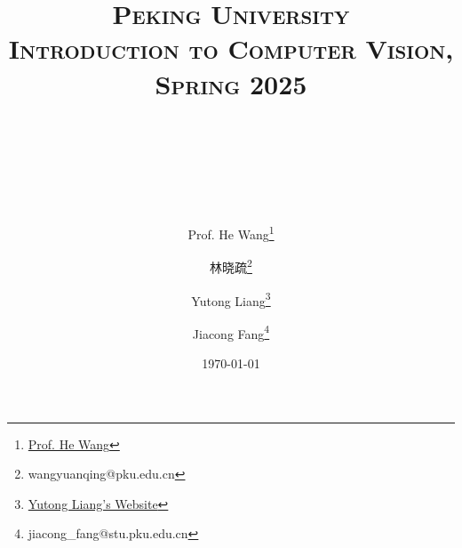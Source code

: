 

\title{
{\normalfont\normalsize\textsc{
Peking University\\
Introduction to Computer Vision, Spring 2025 \\[25pt]}}
\horrule{0.5pt}\\
\\
\horrule{1.8pt}\\[20pt]
}

\author[1]{Prof. He Wang\thanks{\href{https://hughw19.github.io/}{Prof. He Wang}}}
\author[2]{林晓疏\thanks{wangyuanqing@pku.edu.cn}}
\author[2]{Yutong Liang\thanks{\href{https://lyt0112.com/}{Yutong Liang's Website}}}
\author[2]{Jiacong Fang\thanks{jiacong\_fang@stu.pku.edu.cn}}

\date{\today}

\pagestyle{fancy}
\fancyhf{}
\fancyhead[L]{\leftmark}  %
\fancyfoot[C]{\thepage}  %



	\maketitle
	
	\clearpage
	\tableofcontents
	
	
	
	


	\clearpage
	\appendix
	
	
		
	

    
    
